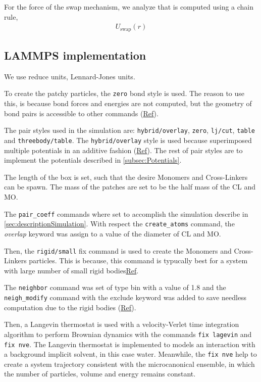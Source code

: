 \documentclass[main.tex]{subfiles}
\begin{document}
For the force of the swap mechanism, we analyze that is computed using a chain rule,
\begin{align*}
    U_\mathrm{swap}(r)
\end{align*}


\subsection{LAMMPS implementation}

We use reduce units, Lennard-Jones units.

To create the patchy particles, the \verb|zero| bond style is used.
The reason to use this, is because bond forces and energies are not computed, but the geometry of bond pairs is accessible to other commands (\href{https://docs.lammps.org/bond_zero.html}{Ref}).

The pair styles used in the simulation are: \verb|hybrid/overlay|, \verb|zero|, \verb|lj/cut|, \verb|table| and \verb|threebody/table|.
The \verb|hybrid/overlay| style is used because superimposed multiple potentials in an additive fashion (\href{https://docs.lammps.org/pair_hybrid.html}{Ref}).
The rest of pair styles are to implement the potentials described in \ref{subsec:Potentials}.

The length of the box is set, such that the desire Monomers and Cross-Linkers can be spawn.
The mass of the patches are set to be the half mass of the CL and MO.

The \verb|pair_coeff| commands where set to accomplish the simulation describe in \ref{sec:descriptionSimulation}.
With respect the \verb|create_atoms| command, the \textit{overlap} keyword was assign to a value of the diameter of CL and MO.

Then, the \verb|rigid/small| fix command is used to create the Monomers and Cross-Linkers particles.
This is because, this command is typucally best for a system with large number of small rigid bodies\href{https://docs.lammps.org/fix_rigid.html}{Ref}.

The \verb|neighbor| command was set of type bin with a value of 1.8 and the \verb|neigh_modify| command with the exclude keyword was added to save needless computation due to the rigid bodies (\href{https://docs.lammps.org/neigh_modify.html}{Ref}).

Then, a Langevin thermostat is used with a velocity-Verlet time integration algorithm to perform Brownian dynamics with the commands \verb|fix lagevin| and \verb|fix nve|.
The Langevin thermostat is implemented to models an interaction with a background implicit solvent, in this case water.
Meanwhile, the \verb|fix nve| help to create a system trajectory consistent with the microcanonical ensemble, in which the number of particles, volume and energy remains constant.
\end{document}
